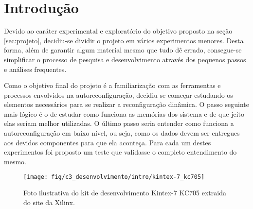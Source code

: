 \documentclass[11pt,a4paper,oneside]{book}
\begin{document}
	\frontmatter
	\tableofcontents
	\mainmatter
	
	\newcommand\qt[1]{\lq\lq{}#1\rq\rq{}}
	\newcommand\qti[1]{\lq\lq{}\textit{#1}\rq\rq{}}
\fi

                      
\chapter{Introdu\c{c}\~{a}o}
\vspace{0.8cm}

Devido ao caráter experimental e exploratório do objetivo proposto na seção \ref{sec:projeto}, decidiu-se dividir o projeto em vários experimentos menores.
Desta forma, além de garantir algum material mesmo que tudo dê errado, consegue-se simplificar o processo de pesquisa e desenvolvimento através dos pequenos passos e análises frequentes.

Como o objetivo final do projeto é a familiarização com as ferramentas e processos envolvidos na autoreconfiguração, decidiu-se começar estudando os elementos necessários para se realizar a reconfiguração dinâmica.
O passo seguinte mais lógico é o de estudar como funciona as memórias dos sistema e de que jeito elas seriam melhor utilizadas.
O último passo seria entender como funciona a autoreconfiguração em baixo nível, ou seja, como os dados devem ser entregues aos devidos componentes para que ela aconteça.
Para cada um destes experimentos foi proposto um teste que validasse o completo entendimento do mesmo.

\begin{figure}[h]
\centering
\texttt{[image: fig/c3\_desenvolvimento/intro/kintex-7\_kc705]}
\caption{Foto ilustrativa do kit de desenvolvimento Kintex-7 KC705 extraida do site da Xilinx.}
\label{fig:kc705}
\end{figure}
\end{document}
